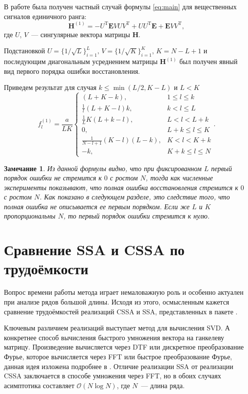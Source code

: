 \documentclass[12pt,a4paper]{article}
\newtheorem{remark}{Замечание}%
\begin{document}
В работе \cite{NekrutkinPerp} была получен частный случай формулы \eqref{eq:main} для вещественных сигналов единичного ранга:
$$\mathbf{H}^{(1)} = -U^{\mathrm{T}} \mathbf{E} V U V^{\mathrm{T}} + U U^{\mathrm{T}} \mathbf{E} + \mathbf{E} V V^{\mathrm{T}},$$
где $U$, $V$~--- сингулярные вектора матрицы $\mathbf{H}$.

Подстановкой $U = \{1/\sqrt{L}\}^{L}_{i = 1},\, V = \{1/\sqrt{K}\}^{K}_{i = 1}$, $K = N - L + 1$ и последующим диагональным усреднением матрицы $\mathbf{H}^{(1)}$ был получен явный вид первого порядка ошибки восстановления.

Приведем результат для случая $k \leq \min(L/2, K - L)$ и $L < K$
$$f^{(1)}_l = \frac{a}{{LK}}
\begin{cases}
	(L + K - k), & \text{$1 \leq l \leq k$}\\
	\frac{1}{l}(L + K - l)k, & \text{$k < l \leq L$}\\
	\frac{1}{L}K(L + k - l), &\text{$L < l < L + k$}\\
	0, &\text{$L + k \leq l \leq K$}\\
	\frac{1}{N - l + 1}(K - l)(L - k), &\text{$K < l < K + k$}\\
	-k, &\text{$K + k \leq l \leq N $}
\end{cases}.$$

\begin{remark}
Из данной формулы видно, что при фиксированном $L$ первый порядок ошибки не стремится к $0$ с ростом $N$, тогда как численные эксперименты показывают, что полная ошибка восстановления стремится к $0$ с ростом $N$. Как показано в следующем разделе, это следствие того, что полная ошибка не описывается ее первым порядком. Если же $L$ и $K$ пропорциональны $N$, то первый порядок ошибки стремится к нулю.
\end{remark}

\section{Сравнение SSA и CSSA по трудоёмкости}
\label{sec:cssa_comp}

Вопрос времени работы метода играет немаловажную роль и особенно актуален при анализе рядов большой длины. Исходя из этого, осмысленным кажется сравнение трудоёмкостей реализаций CSSA и SSA, представленных в пакете \cite{Korobeynikov.etal2014}.

Ключевым различием реализаций выступает метод для вычисления SVD. А конкретнее способ вычисления быстрого умножения вектора на ганкелеву матрицу. Произведение вычисляется через DTF или дискретное преобразование Фурье, которое вычисляется через FFT или быстрое преобразование Фурье, данная идея изложена подробнее в \cite{Korobeynikov2010}. Отличие реализации SSA от реализации CSSA заключается в способе умножения через FFT, но в обоих случаях асимптотика составляет $\mathcal{O}(N \log N)$, где $N$~--- длина ряда.
\end{document}

